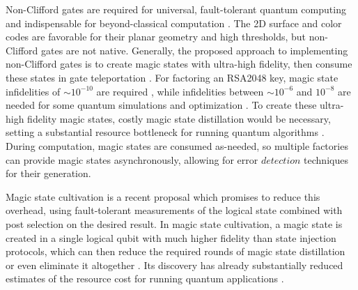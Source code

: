 \documentclass[%
 reprint,
 amsmath,amssymb,
 aps,
]{revtex4-2}
\begin{document}
Non-Clifford gates are required for universal, fault-tolerant quantum computing \cite{gidney_magic_2024, bravyi_universal_2005, kubica_universal_2015, postler_demonstration_2022, dasu_breaking_2025, gupta_encoding_2024, bluvstein_architectural_2025} and indispensable for beyond-classical computation \cite{abanin_observation_2025, morvan_phase_2024, ebadi_quantum_2022}. The 2D surface \cite{bravyi_universal_2005, acharya_quantum_2025, fowler_surface_2012, eickbusch_demonstration_2025, debroy_luci_2025} and color codes \cite{bombin_gauge_2015, lacroix_scaling_2025, lee_low-overhead_2025, gidney_new_2023, kubica_universal_2015} are favorable for their planar geometry and high thresholds, but non-Clifford gates are not native. Generally, the proposed approach to implementing non-Clifford gates is to create magic states with ultra-high fidelity, then consume these states in gate teleportation \cite{rodriguez_experimental_2025, dasu_breaking_2025, daguerre_experimental_2025, gupta_encoding_2024, ye_logical_2023}. For factoring an RSA2048 key, magic state infidelities of $\sim 10^{-10}$ are required \cite{gidney_how_2025}, while infidelities between $\sim 10^{-6}$ and $ 10^{-8}$ are needed for some quantum simulations and optimization \cite{low_fast_2025, babbush_grand_2025, khattar_verifiable_2025, kan_resource-optimized_2025}. To create these ultra-high fidelity magic states, costly magic state distillation would be necessary, setting a substantial resource bottleneck for running quantum algorithms \cite{babbush_grand_2025, dalzell_quantum_2025}. 
During computation, magic states are consumed as-needed, so multiple factories can provide magic states asynchronously, allowing for error $\textit{detection}$ techniques for their generation.

Magic state cultivation \cite{gidney_magic_2024} is a recent proposal which promises to reduce this overhead, using fault-tolerant measurements of the logical state combined with post selection on the desired result. In magic state cultivation, a magic state is created in a single logical qubit with much higher fidelity than state injection protocols, which can then reduce the required rounds of magic state distillation or even eliminate it altogether \cite{chen_efficient_2025, hirano_efficient_2025, heusen_efficient_2025, vaknin_efficient_2025, gidney_magic_2024}. Its discovery has already substantially reduced estimates of the resource cost for running quantum applications \cite{gidney_magic_2024, gidney_how_2025, lee_low-overhead_2025}. 
\end{document}
